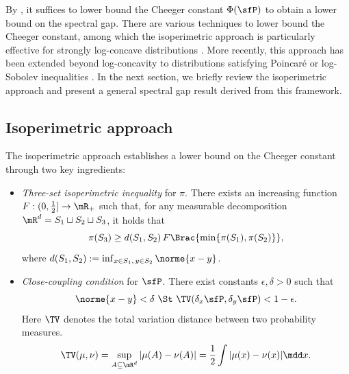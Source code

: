 \documentclass[11pt]{article}
\begin{document}
By , it suffices to lower bound the Cheeger constant $\Phi(\sfP)$ to obtain a lower bound on the spectral gap.
%
There are various techniques to lower bound the Cheeger constant, among which the isoperimetric approach is particularly effective for strongly log-concave distributions \citep{pmlr-v75-dwivedi18a,24-AAP2058}.
More recently, this approach has been extended beyond log-concavity to distributions satisfying Poincar\'e or log-Sobolev inequalities \citep{goyal2025mixing}.
%
In the next section, we briefly review the isoperimetric approach and present a general spectral gap result derived from this framework.




\subsection{Isoperimetric approach}
\label{sec:IsoApproach}

The isoperimetric approach \citep{MR2178341,pmlr-v75-dwivedi18a,24-AAP2058} establishes a lower bound on the Cheeger constant through two key ingredients:

\begin{itemize}
    \item \emph{Three-set isoperimetric inequality} for $\pi$.
    There exists an increasing function \( F:(0,\frac{1}{2} ] \to \mR_+ \) such that, for any measurable decomposition
    \( \mR^d = S_1 \sqcup S_2 \sqcup S_3\),
    it holds that
    \begin{equation}
    \label{eqn:3setIsoIneq}
        \pi(S_3) \ge d(S_1,S_2) \, F \Brac{ \min \{ \pi(S_1), \pi(S_2) \} },
    \end{equation}
    where $d(S_1,S_2) := \inf_{x\in S_1,\,y\in S_2} \norme{ x-y }$.
    \item \emph{Close-coupling condition} for \(\sfP\).
    There exist constants $\epsilon,\delta>0$ such that
    \begin{equation}
    \label{eqn:CloseCouple}
        \norme{ x-y } < \delta ~\St~ \TV (\delta_x \sfP,\delta_y \sfP) < 1-\epsilon .
    \end{equation}
    Here $\TV$ denotes the total variation distance between two probability measures.
    \begin{equation}
    \label{eqn:TV}
        \TV(\mu,\nu) = \sup_{A\subseteq\mR^d} |\mu(A) - \nu(A)| = \frac{1}{2} \int | \mu(x) - \nu(x) | \mdd x.
    \end{equation}
\end{itemize}
\end{document}
